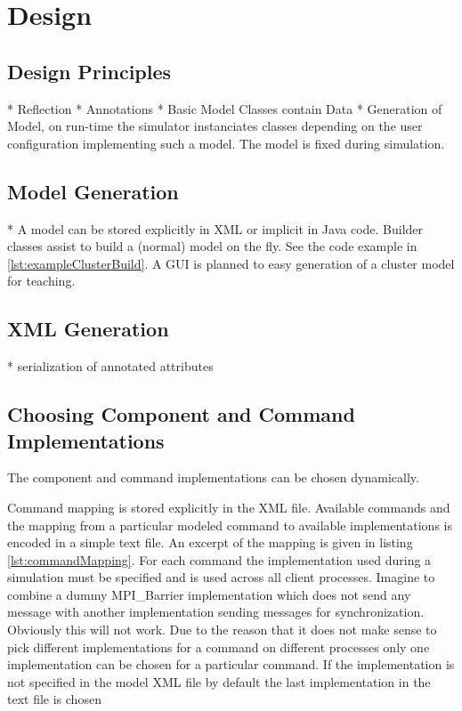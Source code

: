 \documentclass[
     11pt,         %
     a4paper,      %
     BCOR10mm,     %
     DIV14,        %
     liststotoc,   %
     bibtotoc,     %
     idxtotoc,     %
     parskip       %
     ]{scrreprt}   %
\begin{document}
\chapter{Design}

\section{Design Principles}
* Reflection
* Annotations
* Basic Model Classes contain Data
* Generation of Model, on run-time the simulator instanciates classes depending on the user configuration implementing such a model. The model is fixed during simulation.

\section{Model Generation}
* A model can be stored explicitly in XML or implicit in Java code.
Builder classes assist to build a (normal) model on the fly.
See the code example in \ref{lst:exampleClusterBuild}. 
A GUI is planned to easy generation of a cluster model for teaching.


\section{XML Generation}
* serialization of annotated attributes


\section{Choosing Component and Command Implementations}
The component and command implementations can be chosen dynamically.

Command mapping is stored explicitly in the XML file.
Available commands and the mapping from a particular modeled command to available
implementations is encoded in a simple text file.
An excerpt of the mapping is given in listing \ref{lst:commandMapping}.
For each command the implementation used during a simulation must be specified and is used across
all client processes. Imagine to combine a dummy MPI\_Barrier implementation which
does not send any message with another implementation sending messages for synchronization.
Obviously this will not work. Due to the reason that it does not make sense to pick different
implementations for a command on different processes only one implementation can be chosen for
a particular command.
If the implementation is not specified in the model XML file by default the last implementation 
in the text file is chosen
\end{document}
